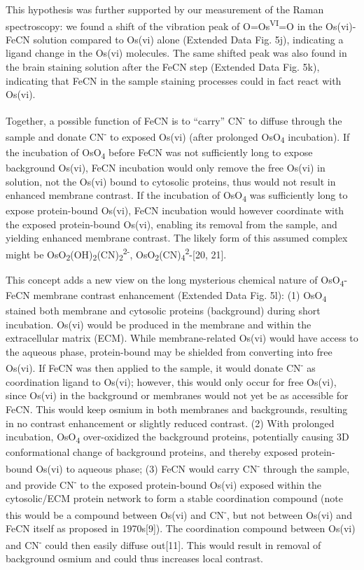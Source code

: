 \documentclass{article}
\begin{document}
This hypothesis was further supported by our measurement of the Raman spectroscopy: we found a shift of the vibration peak of O=Os\textsuperscript{VI}=O in the Os(vi)-FeCN solution compared to Os(vi) alone (Extended Data Fig. 5j), indicating a ligand change in the Os(vi) molecules. The same shifted peak was also found in the brain staining solution after the FeCN step (Extended Data Fig. 5k), indicating that FeCN in the sample staining processes could in fact react with Os(vi).  

Together, a possible function of FeCN is to “carry” CN\textsuperscript{-} to diffuse through the sample and donate CN\textsuperscript{-} to exposed Os(vi) (after prolonged OsO\textsubscript{4} incubation). If the incubation of OsO\textsubscript{4} before FeCN was not sufficiently long to expose background Os(vi), FeCN incubation would only remove the free Os(vi) in solution, not the Os(vi) bound to cytosolic proteins, thus would not result in enhanced membrane contrast. If the incubation of OsO\textsubscript{4 }was sufficiently long to expose protein-bound Os(vi), FeCN incubation would however coordinate with the exposed protein-bound Os(vi), enabling its removal from the sample, and yielding enhanced membrane contrast. The likely form of this assumed complex might be OsO\textsubscript{2}(OH)\textsubscript{2}(CN)\textsubscript{2}\textsuperscript{2-}, OsO\textsubscript{2}(CN)\textsubscript{4}\textsuperscript{2}-[20, 21]. 

This concept adds a new view on the long mysterious chemical nature of OsO\textsubscript{4}-FeCN membrane contrast enhancement (Extended Data Fig. 5l): (1) OsO\textsubscript{4} stained both membrane and cytosolic proteins (background) during short incubation. Os(vi) would be produced in the membrane and within the extracellular matrix (ECM). While membrane-related Os(vi) would have access to the aqueous phase, protein-bound may be shielded from converting into free Os(vi). If FeCN was then applied to the sample, it would donate CN\textsuperscript{-} as coordination ligand to Os(vi); however, this would only occur for free Os(vi), since Os(vi) in the background or membranes would not yet be as accessible for FeCN. This would keep osmium in both membranes and backgrounds, resulting in no contrast enhancement or slightly reduced contrast. (2) With prolonged incubation, OsO\textsubscript{4} over-oxidized the background proteins, potentially causing 3D conformational change of background proteins, and thereby exposed protein-bound Os(vi) to aqueous phase; (3) FeCN would carry CN\textsuperscript{-} through the sample, and provide CN\textsuperscript{-} to the exposed protein-bound Os(vi) exposed within the cytosolic/ECM protein network to form a stable coordination compound (note this would be a compound between Os(vi) and CN\textsuperscript{-}, but not between Os(vi) and FeCN itself as proposed in 1970s[9]). The coordination compound between Os(vi) and CN\textsuperscript{-} could then easily diffuse out[11]. This would result in removal of background osmium and could thus increases local contrast.
\end{document}
